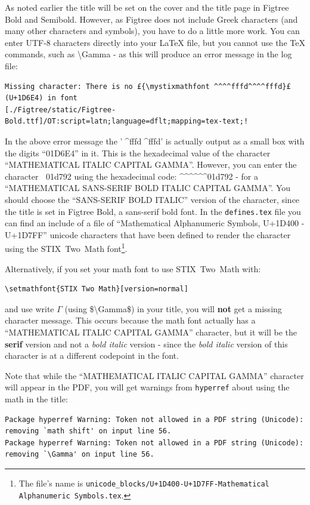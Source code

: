 \documentclass[12pt, twoside]{article}
\newcommand{\fname}[1]{\texttt{#1}}
\begin{document}
As noted earlier the title will be set on the cover and the title page in Figtree Bold and Semibold. However, as Figtree does not include Greek characters (and many other characters and symbols), you have to do a little more work. You can enter UTF-8 characters directly into your \LaTeX{} file, but you cannot use the \TeX{} commands, such as \textbackslash Gamma - as this will produce an error message in the log file:
\begin{lstlisting}[basicstyle=\scriptsize, escapechar=£]
Missing character: There is no £{\mystixmathfont ^^^^fffd^^^^fffd}£ (U+1D6E4) in font
[./Figtree/static/Figtree-Bold.ttf]/OT:script=latn;language=dflt;mapping=tex-text;!
\end{lstlisting}

\noindent In the above error message the '{\mystixmathfont ^^^^fffd^^^^fffd}' is actually output as a small box with the digits \enquote{01D6E4} in it. This is the hexadecimal value of the character \enquote{MATHEMATICAL ITALIC CAPITAL GAMMA}. However, you can enter the character {\mystixmathfont ^^^^^^01d792} using the hexadecimal code: 
\textasciicircum\textasciicircum\textasciicircum\textasciicircum\textasciicircum \textasciicircum 01d792 - for a \enquote{MATHEMATICAL SANS-SERIF BOLD ITALIC CAPITAL GAMMA}. You should choose the \enquote{SANS-SERIF BOLD ITALIC} version of the character, since the title is set in Figtree Bold, a sans-serif bold font. In the \fname{defines.tex} file you can find an include of a file of \enquote{Mathematical Alphanumeric Symbols, U+1D400 - U+1D7FF}  unicode characters that have been defined to render the character using the \gls{STIX}~Two~Math font\footnote{The file's name is \fname{unicode\_blocks/U+1D400-U+1D7FF-Mathematical Alphanumeric Symbols.tex}.}.


Alternatively, if you set your math font to use \gls{STIX}~Two~Math with:
\begin{Verbatim}[breaklines=true]
 \setmathfont{STIX Two Math}[version=normal]
\end{Verbatim}
\noindent and use write $\Gamma$ (using \$\textbackslash Gamma\$) in your title, you will \textbf{not} get a missing character message. This occurs because the math font actually has a \enquote{MATHEMATICAL ITALIC CAPITAL GAMMA} character, but it will be the \textbf{serif} version and not a \textit{bold italic} version - since the \textit{bold italic} version of this character is at a different codepoint in the font.

Note that while the \enquote{MATHEMATICAL ITALIC CAPITAL GAMMA} character will appear in the \gls{PDF}, you will get warnings from \texttt{hyperref} about using the math in the title:
\begin{Verbatim}[breaklines=true]
Package hyperref Warning: Token not allowed in a PDF string (Unicode): removing `math shift' on input line 56.
Package hyperref Warning: Token not allowed in a PDF string (Unicode): removing `\Gamma' on input line 56.
\end{Verbatim}
\end{document}
